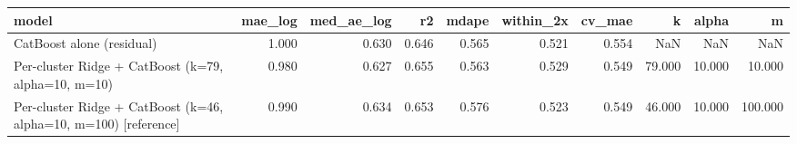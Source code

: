 \begin{tabular}{lrrrrrrrrr}
\toprule
model & mae_log & med_ae_log & r2 & mdape & within_2x & cv_mae & k & alpha & m \\
\midrule
CatBoost alone (residual) & 1.000 & 0.630 & 0.646 & 0.565 & 0.521 & 0.554 & NaN & NaN & NaN \\
Per-cluster Ridge + CatBoost (k=79, alpha=10, m=10) & 0.980 & 0.627 & 0.655 & 0.563 & 0.529 & 0.549 & 79.000 & 10.000 & 10.000 \\
Per-cluster Ridge + CatBoost (k=46, alpha=10, m=100) [reference] & 0.990 & 0.634 & 0.653 & 0.576 & 0.523 & 0.549 & 46.000 & 10.000 & 100.000 \\
\bottomrule
\end{tabular}
